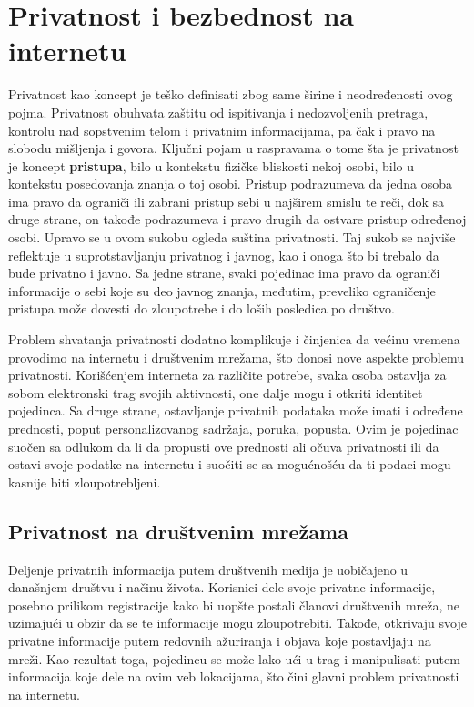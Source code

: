 \documentclass[12pt, a4paper]{article}
\begin{document}
{\section{Privatnost i bezbednost na internetu}	
\label{sec:sigurnost}

Privatnost kao koncept je teško definisati zbog same širine i neodređenosti ovog pojma. Privatnost obuhvata zaštitu od ispitivanja i nedozvoljenih pretraga,
kontrolu nad sopstvenim telom i privatnim informacijama, pa čak i pravo
na slobodu mišljenja i govora. Ključni pojam u raspravama o tome šta
je privatnost je koncept \textbf{pristupa}, bilo u kontekstu fizičke bliskosti nekoj
osobi, bilo u kontekstu posedovanja znanja o toj osobi. Pristup podrazumeva da jedna osoba ima pravo da ograniči ili zabrani pristup sebi
u najširem smislu te reči, dok sa druge strane, on takođe podrazumeva i
pravo drugih da ostvare pristup određenoj osobi. Upravo se u ovom sukobu ogleda suština privatnosti. Taj sukob se najviše reflektuje u suprotstavljanju privatnog i javnog, kao i onoga što bi trebalo da bude privatno i javno. Sa jedne strane, svaki pojedinac ima pravo da ograniči informacije o sebi koje su deo javnog znanja, međutim, preveliko ograničenje pristupa može dovesti do zloupotrebe i do loših posledica po društvo.

Problem shvatanja privatnosti dodatno komplikuje i činjenica da većinu vremena provodimo na internetu i društvenim mrežama, što donosi nove aspekte problemu privatnosti. Korišćenjem interneta za različite potrebe, svaka osoba ostavlja za sobom elektronski trag svojih aktivnosti, one dalje mogu i otkriti identitet pojedinca. Sa druge strane, ostavljanje privatnih podataka može imati i određene prednosti, poput personalizovanog sadržaja, poruka, popusta. Ovim je pojedinac suočen sa odlukom  da li da propusti ove prednosti ali očuva privatnosti ili da ostavi svoje podatke na internetu i suočiti se sa mogućnošću da ti podaci mogu kasnije biti zloupotrebljeni.


\subsection{Privatnost na društvenim mrežama}

Deljenje privatnih informacija putem društvenih medija je uobičajeno u današnjem društvu i načinu života. Korisnici dele svoje privatne informacije, posebno prilikom registracije kako bi uopšte postali članovi društvenih mreža, ne uzimajući u obzir da se te informacije mogu zloupotrebiti. 
Takođe, otkrivaju svoje privatne informacije putem redovnih ažuriranja i objava koje postavljaju na mreži. Kao rezultat toga, pojedincu se može lako ući u trag i manipulisati putem informacija koje dele na ovim veb lokacijama, što čini glavni problem privatnosti na internetu.


}
\end{document}
